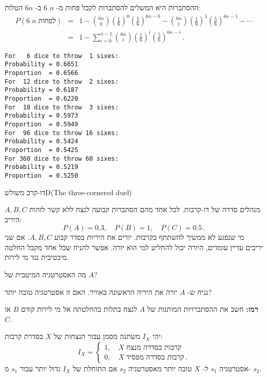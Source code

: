 ההסתברות היא המשלים להסתברות לקבל פחות מ-%
$n$ $6$
ב-%
$6n$
הטלות:
\begin{eqnarray*}
P(6\; n\;\textrm{לפחות})&=&
  1-{6n \choose 0}\left(\frac{1}{6}\right)^0\left(\frac{5}{6}\right)^{6n-0}-
  {6n\choose 1}\left(\frac{1}{6}\right)^{1}\left(\frac{5}{6}\right)^{6n-1}-\cdots\\
&=&1-\sum_{i=0}^{n-1}{6n\choose i}\left(\frac{1}{6}\right)^{i}\left(\frac{5}{6}\right)^{6n-i}\,.
\end{eqnarray*}

\sml{}

\begin{verbatim}
For   6 dice to throw  1 sixes:
Probability = 0.6651
Proportion  = 0.6566
For  12 dice to throw  2 sixes:
Probability = 0.6187
Proportion  = 0.6220
For  18 dice to throw  3 sixes:
Probability = 0.5973
Proportion  = 0.5949
For  96 dice to throw 16 sixes:
Probability = 0.5424
Proportion  = 0.5425
For 360 dice to throw 60 sixes:
Probability = 0.5219
Proportion  = 0.5250
\end{verbatim}



\begin{prob}{דו-קרב משולש}{D}{(The three-cornered duel)}

$A,B,C$
מנהלים סדרה של דו-קרבות. לכל אחד מהם הסתברות קבועה לנצח ללא קשר לזהות היריב:
\[
P(A)=0.3,\quad P(B)=1, \quad P(C)=0.5\,.
\]
מי שנפגע לא ממשיך להשתתף בקרבות. יורים את היריות בסדר קבוע 
$A,B,C$.
אם שני יריבים עדיין עומדים, היורה יכול להחליט למי הוא יורה. אפשר להניח שכל אחד מקבל החלטה מיבטיבית נגד מי לירות.

מה האסטרטגיה המיטבית של
$A$?

נניח ש-%
$A$
יורה את היריה הראשונה באוויר. האם זו אסטרטגיה טובה יותר?

\textbf{רמז:}
חשב את ההסתברויות המותנות של 
$A$
לנצח בתלות בהחלטתה אל מי לירות קודם
$B$
או
$C$.
\end{prob}

\solution{}

יהי 
$I_X$
משתנה מסמן עבור הנצחות של 
$X$
בסדרת קרבות:
\[
I_X=
\left\{
\begin{array}{ll}
1,\quad X\;\textrm{קרבות בסדרה מנצח}\\
0, \quad X\; \textrm{קרבות בסדרה מפסיד}\,.
\end{array}
\right.
\]
אסטרטגיה
$s_1$
ל-%
$X$
טובה יותר מאסטרטגיה
$s_2$
אם התוחלת של
$I_X$
גדול יותר עבור 
$s_1$
מ-%
$s_2$.

